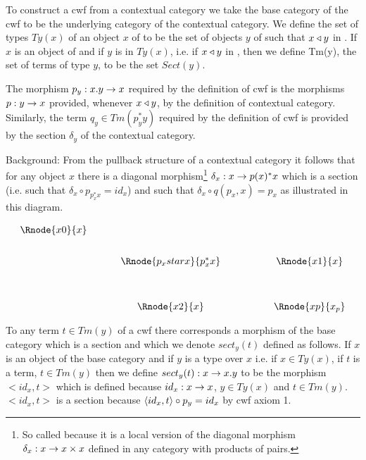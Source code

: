 \note To construct a cwf from a contextual category we take the base category of the cwf to be the underlying category of the contextual category. We define the set of types $Ty(x)$ of an object 
$x$ of \catcw to be the set of objects $y$ of \catcw such that $x \triangleleft y$ in \catc. 
If $x$ is an object of \catcw and if $y$ is in $Ty(x)$, i.e. if $x \triangleleft y$ in \catc, then
we define Tm(y), the set of terms of type $y$, to be the set $Sect(y)$.

The morphism $p_y: x.y \rightarrow x$ required by the definition of cwf is the morphisms $p: y \rightarrow x$ provided, whenever $x \triangleleft y$, by the definition of contextual category.
Similarly, the term $q_y \in Tm(p_y ^* y)$ required by the definition of cwf is provided by the 
section $\delta_y$ of the contextual category. 

\note 
Background: From the pullback structure of  a contextual category it follows that for any
object $x$ there is a diagonal morphism\footnote{So called because it is a local version of the diagonal 
morphism $\delta_x:x \rightarrow x \times x$  defined in any category with products of pairs.}
$\delta_x : x \rightarrow p(x)^*x$ which is a section (i.e. such that $\delta_x \circ p_{p_x^*x} = id_x$) and such that $\delta_x \circ q(p_x,x)=p_x$ as illustrated in this diagram.

\vspace{3mm}
\begin{center}
\begin{equation*}
\label{pullback}
\begin{array}{cp{0.5cm}cp{1.2cm}c}
\Rnode{x0}{x} &&                     &&           \\ [0.7cm]
             &&\Rnode{p_xstarx}{p_x^*x} && \Rnode{x1}{x}\\ [1.2cm]
             &&\Rnode{x2}{x}         && \Rnode{xp}{x_p}
\end{array}
\end{equation*}
\setlength{\arrnodesepA}{3pt}
\end{center}  

\note To any term $t \in Tm(y)$  of a cwf \catcw there corresponds a morphism of the base category which is a section
and which we denote $sect_y(t)$  defined as follows. 
If $x$ is an object of the base category and if 
$y$ is a type over $x$ i.e. if $x \in Ty(x)$, if $t$ is a term, $t \in Tm(y)$ 
then we define $sect_y(t): x \rightarrow x.y$
to be the morphism $<id_x,t>$ which is defined because $id_x : x \rightarrow x$, $y \in Ty(x)$ and $t \in Tm(y)$.
$<id_x,t>$ is a section because $\langle id_x,t\rangle \circ p_y=id_x$ by cwf axiom 1.

